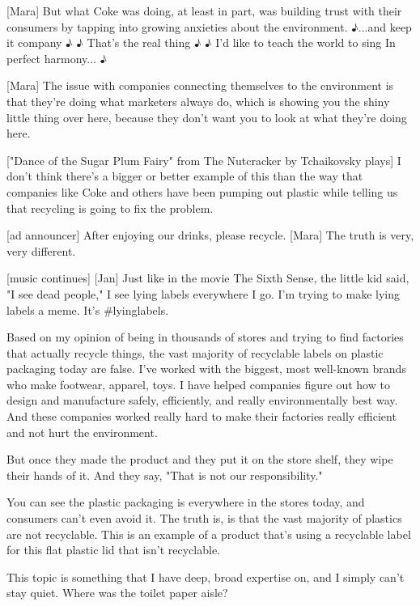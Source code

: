 \documentclass[a4paper]{article}
\begin{document}
	
	
	[Mara] But what Coke was doing, at least in part, was building trust with their consumers by tapping into growing anxieties about the environment.
	♪...and keep it company ♪
	♪ That's the real thing ♪
	♪ I'd like to teach the world to sing In perfect harmony... ♪
	
	
	[Mara] The issue with companies connecting themselves to the environment is that they're doing what marketers always do, which is showing you the shiny little thing over here, because they don't want you to look at what they're doing here.
	
	
	["Dance of the Sugar Plum Fairy" from The Nutcracker by Tchaikovsky plays]
	I don't think there's a bigger or better example of this than the way that companies like Coke and others have been pumping out plastic while telling us that recycling is going to fix the problem.
	
	
	[ad announcer] After enjoying our drinks, please recycle.
	[Mara] The truth is very, very different.
	
	
	[music continues]
	[Jan] Just like in the movie The Sixth Sense, the little kid said, "I see dead people,"
	I see lying labels everywhere I go.
	I'm trying to make lying labels a meme.
	It's \#lyinglabels.
	
	
	Based on my opinion of being in thousands of stores and trying to find factories that actually recycle things, the vast majority of recyclable labels on plastic packaging today are false.
	I've worked with the biggest, most well-known brands who make footwear, apparel, toys.
	I have helped companies figure out how to design and manufacture safely, efficiently, and really environmentally best way.
	And these companies worked really hard to make their factories really efficient and not hurt the environment.
	
	
	But once they made the product and they put it on the store shelf, they wipe their hands of it.
	And they say, "That is not our responsibility."
	
	
	You can see the plastic packaging is everywhere in the stores today, and consumers can't even avoid it.
	The truth is, is that the vast majority of plastics are not recyclable.
	This is an example of a product that's using a recyclable label for this flat plastic lid that isn't recyclable.


	This topic is something that I have deep, broad expertise on, and I simply can't stay quiet.
	Where was the toilet paper aisle?
	
\end{document}

